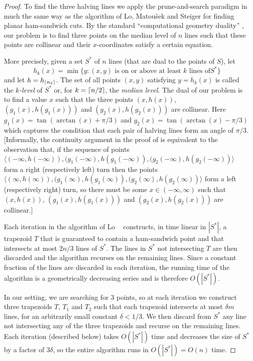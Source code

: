 \documentclass[lotsofwhite]{patmorin}
\newcommand{\blau}[1]{\tan(\arctan(#1)+\pi/3)}
\newcommand{\bleu}[1]{\tan(\arctan(#1)-\pi/3)}
\begin{document}
\begin{proof}

To find the three halving lines we apply the prune-and-search paradigm
in much the same way as the algorithm of Lo, Matou\v{s}ek and Steiger
\cite{lms94} for finding planar ham-sandwich cuts.  By the standard
``computational geometry duality'' \cite[Section~1.3.3]{bkoo97}, our problem
is to find three points on the median level of $n$ lines such that
these points are collinear and their $x$-coordinates satisfy a certain
equation.  

More precisely, given a set $S^*$ of $n$ lines (that are dual to the
points of $S$), let
\[
    h_k(x) = \min\{ y : 
        \mbox{$(x,y)$ is on or above at least $k$ lines of
$S^*$}\} 
\]
and let $h=h_{\left\lceil n_2 \right\rceil}$.  The set of all points $(x,y)$ satisfying
$y=h_k(x)$ is called the \emph{$k$-level} of $S^*$ or, for
$k=\left\lceil n/2 \right\rceil$, the \emph{median level}.
The dual of our problem is to find a value $x$ such that the three points
$(x,h(x))$, $(g_1(x),h(g_1(x)))$ and $(g_2(x),h(g_2(x)))$ are collinear.
Here $g_1(x)=\blau{x}$ and
$g_2(x)=\bleu{x}$ which captures the condition that each pair of halving
lines form an angle of $\pi/3$.  [Informally, the continuity argument in
the proof of  is equivalent to the observation
that, if the sequence of points $\langle(-\infty,h(-\infty)),
(g_1(-\infty),h(g_1(-\infty)), (g_2(-\infty),h(g_2(-\infty))\rangle$ form
a right (respectively left) turn then the points $\langle(\infty,h(\infty)),
(g_1(\infty),h(g_1(\infty)), (g_2(\infty),h(g_2(\infty))\rangle$ form a
left (respectively right) turn, so there must be some
$x\in(-\infty,\infty)$ such that 
$(x,h(x))$, $(g_1(x),h(g_1(x)))$ and $(g_2(x),h(g_2(x)))$ are
collinear.]

Each iteration in the algorithm of Lo \etal\ \cite{lms94} constructs,
in time linear in $|S^*|$, a trapezoid $T$ that is guaranteed to
contain a ham-sandwich point and that intersects at most $2n/3$ lines
of $S^*$.  The lines in $S^*$ not intersecting $T$ are then discarded
and the algorithm recurses on the remaining lines.  Since a constant
fraction of the lines are discarded in each iteration, the running
time of the algorithm is a geometrically decreasing series and is
therefore $O(|S^*|)$.

In our setting, we are searching for 3 points, so at each iteration we
construct three trapezoids $T$, $T_1$ and $T_2$ such that each
trapezoid intersects at most $\delta m$ lines, for an arbitrarily
small constant $\delta < 1/3$.  We then discard from $S^*$ any line
not intersecting any of the three trapezoids and recurse on the
remaining lines.  Each iteration (described below) takes $O(|S^*|)$
time and decreases the size of $S^*$ by a factor of $3\delta$, so the
entire algorithm runs in $O(|S^*|)=O(n)$ time.


\end{proof}
\end{document}

